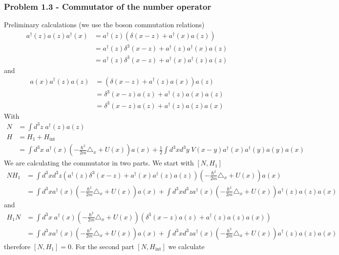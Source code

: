 \documentclass[10pt,a4paper]{book}
\theoremstyle{definition}
\begin{document}
\subsubsection{Problem 1.3 - Commutator of the number operator}
Preliminary calculations (we use the boson commutation relations)
\begin{align}
a^\dagger(z)a(z)a^\dagger(x)&=a^\dagger(z)(\delta(x-z)+a^\dagger(x)a(z))\\
&=a^\dagger(z)\delta^3(x-z)+a^\dagger(z)a^\dagger(x)a(z)\\
&=a^\dagger(z)\delta^3(x-z)+a^\dagger(x)a^\dagger(z)a(z)
\end{align}
and
\begin{align}
a(x)a^\dagger(z)a(z)&=(\delta(x-z)+a^\dagger(z)a(x))a(z)\\
&=\delta^3(x-z)a(z)+a^\dagger(z)a(x)a(z)\\
&=\delta^3(x-z)a(z)+a^\dagger(z)a(z)a(x)
\end{align}
With
\begin{align}
N&=\int d^3z\; a^\dagger(z)a(z)\\
H&=H_1+H_\text{int}\\
&=\int d^3x\; a^\dagger(x)\left(-\frac{\hbar^2}{2m}\triangle_x+U(x)\right)a(x)+\frac{1}{2}\int d^3xd^3y\;V(x-y) a^\dagger(x)a^\dagger(y)a(y)a(x)
\end{align}
We are calculating the commutator in two parts. We start with $[N,H_1]$
\begin{align}
N H_1&=\int d^3xd^3z\left(a^\dagger(z)\delta^3(x-z)+a^\dagger(x)a^\dagger(z)a(z)\right)\left(-\frac{\hbar^2}{2m}\triangle_x+U(x)\right)a(x)\\
&=\int d^3xa^\dagger(x)\left(-\frac{\hbar^2}{2m}\triangle_x+U(x)\right)a(x)+\int d^3xd^3za^\dagger(x)\left(-\frac{\hbar^2}{2m}\triangle_x+U(x)\right)a^\dagger(z)a(z)a(x)
\end{align}
and
\begin{align}
H_1N&=\int d^3x\; a^\dagger(x)\left(-\frac{\hbar^2}{2m}\triangle_x+U(x)\right)(\delta^3(x-z)a(z)+a^\dagger(z)a(z)a(x))\\
&=\int d^3xa^\dagger(x)\left(-\frac{\hbar^2}{2m}\triangle_x+U(x)\right)a(x)+\int d^3xd^3za^\dagger(x)\left(-\frac{\hbar^2}{2m}\triangle_x+U(x)\right)a^\dagger(z)a(z)a(x)
\end{align}
therefore $[N,H_1]=0$.
For the second part $[N,H_\text{int}]$ we calculate
\end{document}
